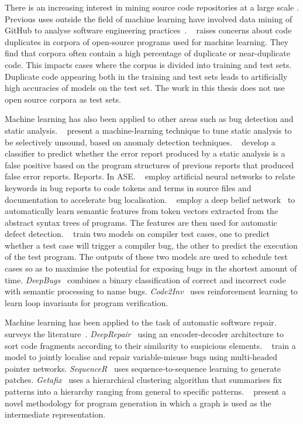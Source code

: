 There is an increasing interest in mining source code repositories at a large scale \cite{Allamanis2013a,White2015a,Bird2009}. Previous uses outside the field of machine learning have involved data mining of GitHub to analyse software engineering practices~\cite{Wu2014,Guzman2014,Baishakhi2014a,Vasilescu2015}. \citeauthor{Allamanis2018}~\cite{Allamanis2018} raises concerns about code duplicates in corpora of open-source programs used for machine learning. They find that corpora often contain a high percentage of duplicate or near-duplicate code. This impacts cases where the corpus is divided into training and test sets. Duplicate code appearing both in the training and test sets leads to artificially high accuracies of models on the test set. The work in this thesis does not use open source corpora as test sets.

Machine learning has also been applied to other areas such as bug detection and static analysis. \citeauthor{Heo2017}~\cite{Heo2017} present a machine-learning technique to tune static analysis to be selectively unsound, based on anomaly detection techniques. \citeauthor{Koc2017}~\cite{Koc2017} develop a classifier to predict whether the error report produced by a static analysis is a false positive based on the program structures of previous reports that produced false error reports. Reports. In ASE. \citeauthor{Lam2016}~\cite{Lam2016} employ artificial neural networks to relate keywords in bug reports to code tokens and terms in source files and documentation to accelerate bug localisation. \citeauthor{Wang2016c}~\cite{Wang2016c} employ a deep belief network~\cite{Hinton2006a} to automatically learn semantic features from token vectors extracted from the abstract syntax trees of programs. The features are then used for automatic defect detection. \citeauthor{Chen2017}~\cite{Chen2017} train two models on compiler test cases, one to predict whether a test case will trigger a compiler bug, the other to predict the execution of the test program. The outputs of these two models are used to schedule test cases so as to maximise the potential for exposing bugs in the shortest amount of time. \emph{DeepBugs}~\cite{Pradel2018} combines a binary classification of correct and incorrect code with semantic processing to name bugs. \emph{Code2Inv}~\cite{Si2018} uses reinforcement learning to learn loop invariants for program verification.

Machine learning has been applied to the task of automatic software repair. \citeauthor{Monperrus2018} surveys the literature~\cite{Monperrus2018}. \emph{DeepRepair}~\cite{White2019} using an encoder-decoder architecture to sort code fragments according to their similarity to suspicious elements. \citeauthor{Vasic2019}~\cite{Vasic2019} train a model to jointly localise and repair variable-misuse bugs using multi-headed pointer networks. \emph{SequenceR}~\cite{Chen2018} uses sequence-to-sequence learning to generate patches. \emph{Getafix}~\cite{Bader2019} uses a hierarchical clustering algorithm that summarises fix patterns into a hierarchy ranging from general to specific patterns. \citeauthor{Brockschmidt2018}~\cite{Brockschmidt2018} present a novel methodology for program generation in which a graph is used as the intermediate representation.

